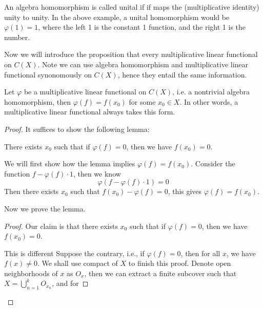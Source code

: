 An algebra homomorphism is called unital if if maps the (multiplicative identity) unity to unity. In the above example, a unital homomorphism would be $\varphi(1)=1$, where the left 1 is the constant 1 function, and the right 1 is the number.



Now we will introduce the proposition that every multiplicative linear functional on $C(X)$. Note we can use algebra homomorphism and multiplicative linear functional synonomously on $C(X)$, hence they entail the same information.
\begin{proposition}
    Let $\varphi$ be a multiplicative linear functional on $C(X)$, i.e. a nontrivial algebra homomorphism, then $\varphi(f)=f(x_0)$ for some $x_0\in X$. In other words, a multiplicative linear functional always takes this form.
\end{proposition}
\begin{proof}
    It suffices to show the following lemma: 
    \begin{lemma}
        There exists $x_0$ such that if $\varphi(f)=0$, then we have $f(x_0)=0$.
    \end{lemma}
    We will first show how the lemma implies $\varphi(f)=f(x_0)$. Consider the function $f-\varphi(f)\cdot 1$, then we know
    \begin{equation*}
        \varphi(f-\varphi(f)\cdot 1)=0
    \end{equation*}
    Then there exists $x_0$ such that $f(x_0)-\varphi(f)=0$, this gives $\varphi(f)=f(x_0)$.  

    Now we prove the lemma.
    \begin{proof}
        Our claim is that there exists $x_0$ such that if $\varphi(f)=0$, then we have $f(x_0)=0$. 

        This is different 
        Suppose the contrary, i.e., if $\varphi(f)=0$, then for all $x$, we have $f(x)\neq 0$.
        We shall use compact of $X$ to finish this proof. Denote open neighborhoods of $x$ as $O_x$, then we can extract a finite subcover such that $X=\bigcup_{n=1}^kO_{x_n}$, and for 
    \end{proof}
\end{proof}


